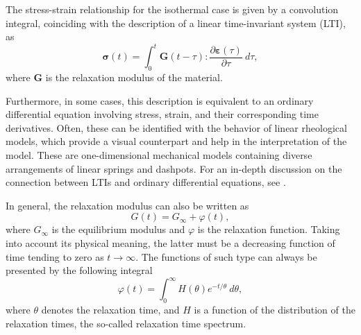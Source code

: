 The stress-strain relationship for the isothermal case is given by a convolution integral, coinciding with the description of a linear time-invariant system (LTI), as
\begin{equation}
\label{eq:stress_constitutive_infinitesimal_viscoelasticity}
	\bm \sigma(t) = \int_0^t \bm G(t-\tau):\frac{\partial \bm \varepsilon(\tau)}{\partial \tau}\ d\tau,
\end{equation}
where $\bm{G}$ is the relaxation modulus of the material.

Furthermore, in some cases, this description is equivalent to an ordinary differential equation involving stress, strain, and their corresponding time derivatives.
Often, these can be identified with the behavior of linear rheological models, which provide a visual counterpart and help in the interpretation of the model.
These are one-dimensional mechanical models containing diverse arrangements of linear springs and dashpots.
For an in-depth discussion on the connection between LTIs and ordinary differential equations, see \cite{ciampaLinearDifferentialEquations2019}.

In general, the relaxation modulus can also be written as \citep{malkinRheologyConceptsMethods2017}
\begin{equation}
\label{eq:relax_mod_decomp}
	G(t) = G_\infty + \varphi(t),
\end{equation}
where $G_\infty$ is the equilibrium modulus and $\varphi$ is the relaxation function.
Taking into account its physical meaning, the latter must be a decreasing function of time tending to zero as $t\to\infty$.
The functions of such type can always be presented by the following integral
\begin{equation}
  \label{eq:relax_time_spectrum}
	\varphi(t) = \int_0^\infty H(\theta) e^{-t/\theta}\ d\theta,
\end{equation}
where $\theta$ denotes the relaxation time, and $H$ is a function of the distribution of the relaxation times, the so-called relaxation time spectrum.

